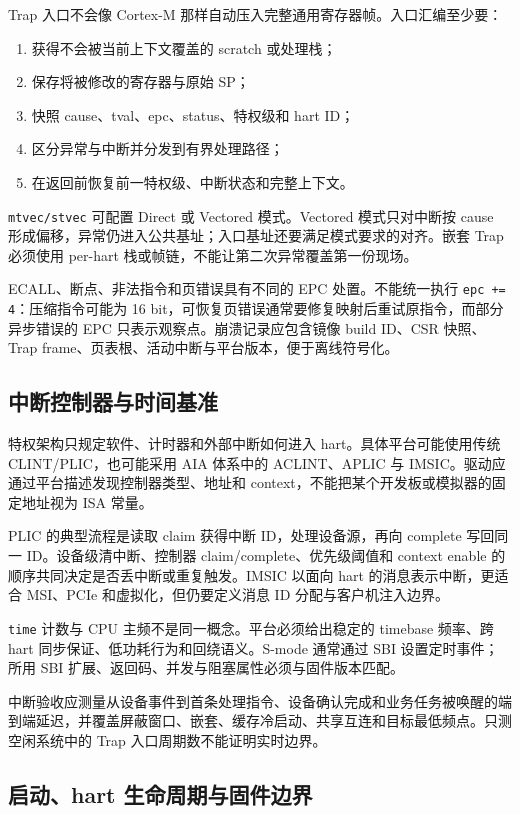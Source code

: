Trap 入口不会像 Cortex-M 那样自动压入完整通用寄存器帧。入口汇编至少要：
\begin{enumerate}
  \item 获得不会被当前上下文覆盖的 scratch 或处理栈；
  \item 保存将被修改的寄存器与原始 SP；
  \item 快照 cause、tval、epc、status、特权级和 hart ID；
  \item 区分异常与中断并分发到有界处理路径；
  \item 在返回前恢复前一特权级、中断状态和完整上下文。
\end{enumerate}

\texttt{mtvec/stvec} 可配置 Direct 或 Vectored 模式。Vectored 模式只对中断按 cause 形成偏移，异常仍进入公共基址；入口基址还要满足模式要求的对齐。嵌套 Trap 必须使用 per-hart 栈或帧链，不能让第二次异常覆盖第一份现场。

ECALL、断点、非法指令和页错误具有不同的 EPC 处置。不能统一执行 \texttt{epc += 4}：压缩指令可能为 16 bit，可恢复页错误通常要修复映射后重试原指令，而部分异步错误的 EPC 只表示观察点。崩溃记录应包含镜像 build ID、CSR 快照、Trap frame、页表根、活动中断与平台版本，便于离线符号化。

\subsection{中断控制器与时间基准}

特权架构只规定软件、计时器和外部中断如何进入 hart。具体平台可能使用传统 CLINT/PLIC，也可能采用 AIA 体系中的 ACLINT、APLIC 与 IMSIC。驱动应通过平台描述发现控制器类型、地址和 context，不能把某个开发板或模拟器的固定地址视为 ISA 常量。

PLIC 的典型流程是读取 claim 获得中断 ID，处理设备源，再向 complete 写回同一 ID。设备级清中断、控制器 claim/complete、优先级阈值和 context enable 的顺序共同决定是否丢中断或重复触发。IMSIC 以面向 hart 的消息表示中断，更适合 MSI、PCIe 和虚拟化，但仍要定义消息 ID 分配与客户机注入边界。

\texttt{time} 计数与 CPU 主频不是同一概念。平台必须给出稳定的 timebase 频率、跨 hart 同步保证、低功耗行为和回绕语义。S-mode 通常通过 SBI 设置定时事件；所用 SBI 扩展、返回码、并发与阻塞属性必须与固件版本匹配\cite{riscv-sbi}。

中断验收应测量从设备事件到首条处理指令、设备确认完成和业务任务被唤醒的端到端延迟，并覆盖屏蔽窗口、嵌套、缓存冷启动、共享互连和目标最低频点。只测空闲系统中的 Trap 入口周期数不能证明实时边界。

\subsection{启动、hart 生命周期与固件边界}

